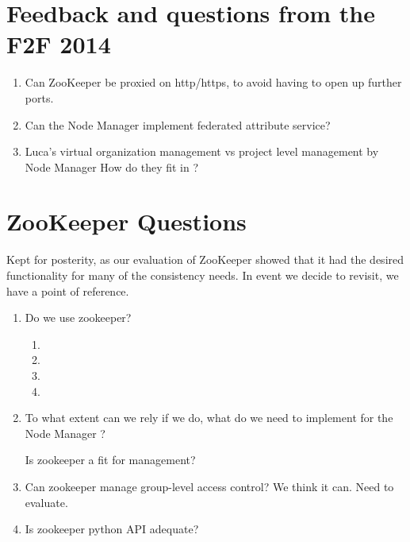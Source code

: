 \documentclass[oneside,12pt]{memoir}
\def\nm{Node Manager{ }}
\begin{document}
\begin{appendices}


\chapter{Feedback and questions from the F2F 2014}
\begin{enumerate}
\item Can ZooKeeper be proxied on http/https, to avoid having to open up further ports.
\item Can the \nm implement federated attribute service?
\item Luca's virtual organization management vs project level management by \nm How do they fit in ?
\end{enumerate}



\chapter{ZooKeeper Questions}
Kept for posterity, as our evaluation of ZooKeeper showed that it had the desired functionality for many of the consistency needs.  In event we decide to revisit, we have a point of reference. 
\begin{enumerate}

\item
Do we use zookeeper?
\begin{enumerate}
\item {}
\item {}
\item {}
\item {} 
\end{enumerate}
\item
To what extent can we rely if we do,  what do we need to implement for the \nm?

Is zookeeper a fit for management?
\item
Can zookeeper manage group-level access control?  We think it can.  Need to evaluate.
\item
Is zookeeper python API adequate?
\end{enumerate}
\end{appendices}
\printbibliography
\hypertarget{mymarker}{}
\printindex
\end{document}
